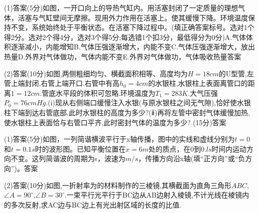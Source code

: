 (1)答案(5分)如图，一开口向上的导热气缸内。用活塞封闭了一定质量的理想气体，活塞与气缸壁间无摩擦。现用外力作用在活塞上。使其缓慢下降。环境温度保持不变，系统始终处于平衡状态。在活塞下降过程中\key{}。(填正确答案标号。选对1个得2分。选对2个得4分，选对3个得5分;每选错1个扣3分，最低得分为0分)A.气体体积逐渐减小，内能增知B.气体压强逐渐增大，内能不变C.气体压强逐渐增大，放出热量D.外界对气体做功，气体内能不变E.外界对气体做功，气体吸收热量答案

(2)答案(10分)如图,两侧粗细均匀、横截面积相等、高度均为$H=18cm$的U型管,左管上端封闭,右管上端开口.右管中有高$h_0=4cm$的水银柱,水银柱上表面离管口的距离$1=12cm.$管底水平段的体积可忽略.环境温度为$T_1=283K.$大气压强$P_0=76cmHg.$(i)现从右侧端口缓慢注入水银(与原水银柱之间无气隙),恰好使水银柱下端到达右管底部.此时水银柱的高度为多少?(ⅱ)再将左管中密封气体缓慢加热,使水银柱上表面恰与右管口平齐,此时密封气体的温度为多少?
\question[6] [物理选修$3–4$](15分)答案

(1)答案(5分)如图，一列简谐横波平行于x轴传播，图中的实线和虚线分别为$t=0$和$t=0.1s$时的波形图。已知平衡位置在$x=6m$处的质点，在0到$0.ls$时间内运动方向不变。这列简谐波的周期为\key{}s，波速为\key{}$m/s，$传播方向沿x轴\key{}(填“正方向”或“负方向”)。答案

(2)答案(10分)如图,一折射率为的材料制作的三棱镜,其横截面为直角三角形$ABC$,$∠A=90^∘$,$∠B=30^∘.$一束平行光平行于BC边从AB边射入棱镜,不计光线在棱镜内的多次反射,求AC边与BC边上有光出射区域的长度的比值.
